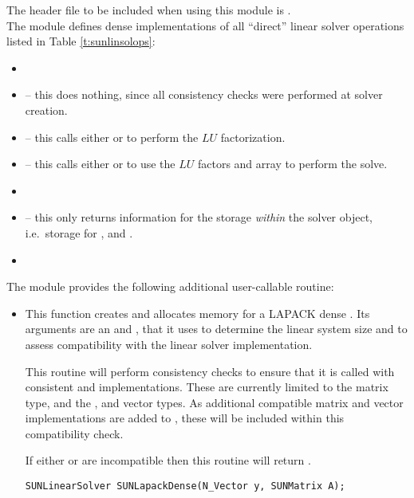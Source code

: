 \noindent The header file to be included when using this module 
is . \\
The {\sunlinsollapdense} module defines dense implementations of all
``direct'' linear solver operations listed in
Table \ref{t:sunlinsolops}:
\begin{itemize}
\item {}
\item {} -- this does nothing, since all
  consistency checks were performed at solver creation.
\item {} -- this calls either
   or  to perform the $LU$ factorization.
\item {} -- this calls either
   or  to use the $LU$ factors and 
  array to perform the solve.
\item {}
\item {} -- this only returns information for
  the storage \emph{within} the solver object, i.e.~storage
  for ,  and .
\item {}
\end{itemize}
The module {\sunlinsollapdense} provides the following additional
user-callable routine: 
\begin{itemize}


\item {}

  This function creates and allocates memory for a LAPACK dense
  .  Its arguments are an {\nvector} and
  {\sunmatrix}, that it uses to determine the linear system size and
  to assess compatibility with the linear solver implementation.

  This routine will perform consistency checks to ensure that it is
  called with consistent {\nvector} and {\sunmatrix} implementations.
  These are currently limited to the {\sunmatdense} matrix type, and
  the {\nvecs}, {\nvecopenmp} and {\nvecpthreads} vector types.  As
  additional compatible matrix and vector implementations are added to
  {\sundials}, these will be included within this compatibility check.

  If either  or  are incompatible then this routine will
  return .

  \verb|SUNLinearSolver SUNLapackDense(N_Vector y, SUNMatrix A);|

\end{itemize}
